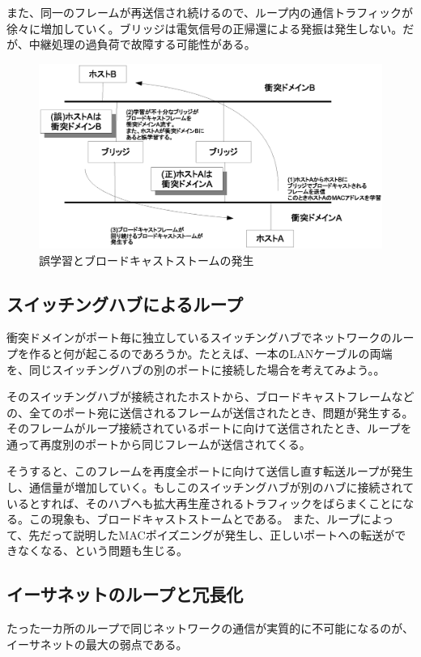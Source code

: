 また、同一のフレームが再送信され続けるので、ループ内の通信トラフィックが徐々に増加していく。ブリッジは電気信号の正帰還による発振は発生しない。だが、中継処理の過負荷で故障する可能性がある。

\begin{figure}[htbp]
	\includegraphics[width=12cm,clip]{draw/bridgeloop.eps}
	\caption{誤学習とブロードキャストストームの発生}
	\label{fig:bridgeloop}
\end{figure}


\subsection{スイッチングハブによるループ}

衝突ドメインがポート毎に独立しているスイッチングハブでネットワークのループを作ると何が起こるのであろうか。たとえば、一本のLANケーブルの両端を、同じスイッチングハブの別のポートに接続した場合を考えてみよう。。

そのスイッチングハブが接続されたホストから、ブロードキャストフレームなどの、全てのポート宛に送信されるフレームが送信されたとき、問題が発生する。そのフレームがループ接続されているポートに向けて送信されたとき、ループを通って再度別のポートから同じフレームが送信されてくる。

そうすると、このフレームを再度全ポートに向けて送信し直す転送ループが発生し、通信量が増加していく。もしこのスイッチングハブが別のハブに接続されているとすれば、そのハブへも拡大再生産されるトラフィックをばらまくことになる。この現象も、ブロードキャストストームとである。
また、ループによって、先だって説明したMACポイズニングが発生し、正しいポートへの転送ができなくなる、という問題も生じる。

\subsection{イーサネットのループと冗長化}
たった一カ所のループで同じネットワークの通信が実質的に不可能になるのが、イーサネットの最大の弱点である。

